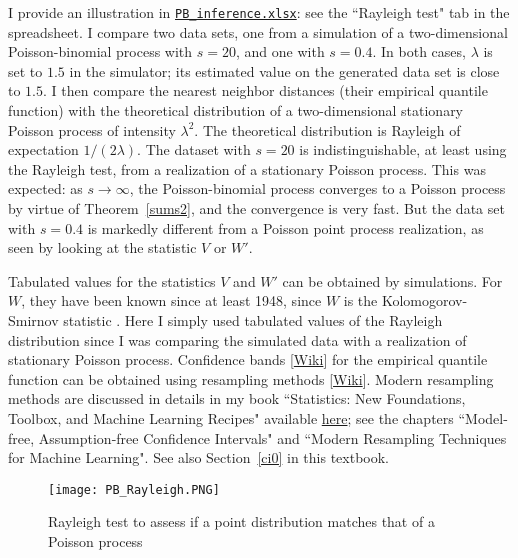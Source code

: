 \documentclass[10pt]{article}
\begin{document}
I provide an illustration in \href{https://github.com/VincentGranville/Point-Processes/tree/main/Spreadsheets}{\texttt{PB\_inference.xlsx}}:  see the ``Rayleigh test" tab in the spreadsheet. I compare two data sets, one from a simulation of a two-dimensional Poisson-binomial process
 with $s=20$, and one with $s=0.4$. In both cases, $\lambda$ is set to $1.5$ in the simulator; its estimated value on the generated data set is close to $1.5$. I then compare the \textcolor{index}{nearest neighbor distances} (their empirical quantile function) with the theoretical distribution of a two-dimensional stationary Poisson process of
intensity $\lambda^2$. The theoretical distribution is Rayleigh of expectation $1/(2\lambda)$. The dataset with $s=20$ is indistinguishable, at least using the Rayleigh test, from a realization of a stationary Poisson process. This was expected: as $s\rightarrow\infty$, the Poisson-binomial process converges to a Poisson process by virtue of Theorem~\ref{sums2}, and the convergence is very fast. But the data set with $s=0.4$ is markedly different from a Poisson point process realization, as seen by looking at the statistic $V$ or $W'$.


Tabulated values for the statistics $V$ and $W'$ can be obtained by simulations. For $W$, they have been known since at least 1948, since $W$ is the
Kolomogorov-Smirnov statistic \cite{kst}. Here I simply used tabulated values of the Rayleigh distribution since I was comparing the simulated data with a realization of stationary Poisson process.
\textcolor{index}{Confidence bands}  [\href{https://en.wikipedia.org/wiki/Confidence_and_prediction_bands}{Wiki}] for the
empirical quantile function can be obtained using \textcolor{index}{resampling} methods [\href{https://en.wikipedia.org/wiki/Resampling_(statistics)}{Wiki}].  Modern resampling methods are discussed in details in my book
``Statistics: New Foundations, Toolbox, and Machine Learning Recipes" \cite{vgstats} available
\href{https://github.com/VincentGranville/Machine-Learning}{here}; see the chapters ``Model-free, Assumption-free Confidence Intervals" and
``Modern Resampling Techniques for Machine Learning". See also Section~\ref{ci0} in this textbook.


\begin{figure}%
\centering
\texttt{[image: PB\_Rayleigh.PNG]}
\caption{Rayleigh test to assess if a point distribution matches that of a Poisson process}
\label{fig:rayleigh7}
\end{figure}
\end{document}
